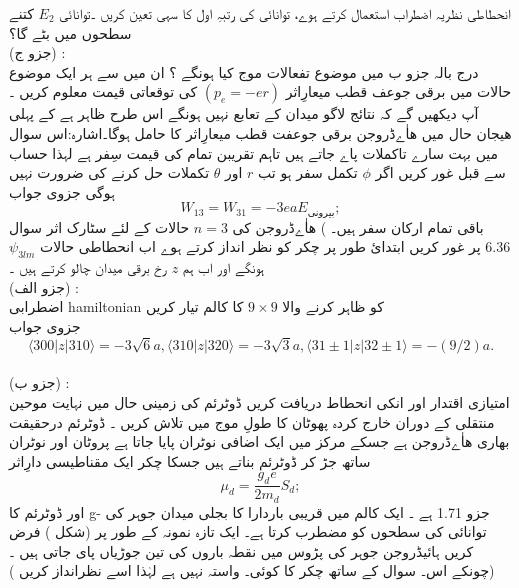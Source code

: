 انحطاطی نظریہ اضطراب استعمال کرتے ہوے، توانائی کی رتبہِ اول کا سہی تعین کریں ۔توانائی 
\(E_{2}\)
کتنے سطحوں میں بٹے گا؟\\
(جزو ج) :\\
 درج بالہ جزو ب میں موضوع تفعالات موج کیا ہونگے ؟ ان میں سے ہر ایک موضوع حالات میں برقی جوعف قطب میعارِاثر
\((p_{e}=-er)\)
کی توقعاتی قیمت معلوم کریں ۔ آپ دیکھیں گے کہ نتائج  لاگو میدان کے تعابع نہیں ہونگے اس طرح ظاہر ہے کے پہلی هیجان حال میں ھاٰےڈروجن برقی جوعفت قطب میعارِاثر کا حامل ہوگا۔اشارہ:اس سوال میں بہت سارے تاكملات پاے جاتے ہیں تاہم تقریبن تمام کی قیمت سِفر ہے لہذا حساب سے قبل غور کریں اگر 
\(\phi\)
تكمل سفر ہو تب 
\(r\)
اور 
\(\theta\)
تکملات حل کرنے  کی ضرورت نہیں ہوگی جزوی جواب
\[W_{13}=W_{31}=-3eaE_{\text{بیرونی}};\]
باقی تمام ارکان سفر ہیں۔ )
 ھاٰےڈروجن کی 
\(n=3\)
حالات کے لئے سٹارک  اثر سوال 6.36 پر غور کریں ابتدائ طور پر چکر کو نظر انداز کرتے ہوے اب انحطاطی حالات 
\(\psi_{3lm}\)
ہونگے اور اب ہم 
\(z\)
رخ برقی میدان چالو کرتے ہیں ۔\\
(جزو الف) :\\ 
اضطرابی hamiltonian کو ظاہر کرنے والا 
\(9\times9\)
کا کالم  تیار کریں\\
 جزوی جواب 
\[\langle 300|z|310\rangle =-3\sqrt{6}a,\langle 310|z|320\rangle =-3\sqrt{3}a,\langle 31\pm1|z|32\pm1\rangle=-(9/2)a.\]\\
(جزو ب) :\\ 
امتیازی اقتدار اور انکی انحطاط دریافت کریں 
  ڈوٹرئم
کی زمینی حال میں نہایت موحین منتقلی کے دوران خارج کردہ پھوٹان کا طولِ موج
میں تلاش کریں ۔ ڈوٹرئم درحقیقت بھاری ھاٰےڈروجن ہے جسکے مرکز میں ایک اضافی نوٹران پایا جاتا ہے پروٹان اور نوٹران ساتھ جڑ کر  ڈوٹرئم بناتے ہیں جسکا چکر ایک مقناطیسی دارِاثر
\[\mu_{d}=\frac{g_{d}e}{2m_{d}}S_{d};\]
اور ڈوٹرئم کا 
g-
جزو 1.71 ہے ۔
 ایک کالم میں قریبی باردارا کا بجلی میدان جوہر کی توانائی کی سطحوں کو مضطرب کرتا ہے۔ ایک تازہ نمونہ کے طور پر   (شکل )   فرض کریں  ہائیڈروجن  جوہر کی پڑوس میں نقطہ باروں کی تین جوڑیاں پای جاتی ہیں ۔(چونکے اس۔ سوال کے ساتھ چکر کا کوئی۔ واستہ نہیں ہے لہٰذا اسے نظرانداز کریں )
 
